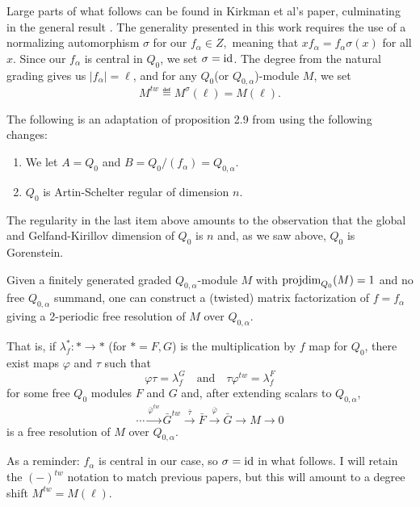 \documentclass [11pt, proquest] {uwthesis}[2020/02/24]
\begin{document}
    Large parts of what follows can be found in Kirkman et al's paper, culminating in the general result \cite{kirkman13}. The generality presented in this work requires the use of a normalizing automorphism $\sigma$ for our $f_\alpha\in Z,$ meaning that $xf_\alpha=f_\alpha\sigma(x)$ for all $x$. Since our $f_\alpha$ is central in $Q_0$, we  set $\sigma=\operatorname{id}$. The degree from the natural grading gives us $|f_\alpha|=\ell$, and for any $Q_0$(or $Q_{0,\alpha}$)-module $M$, we set
    \[M^{tw}\eqdef M^\sigma(\ell)=M(\ell).\]
    
    The following is an adaptation of proposition 2.9 from \cite{kirkman13} using the following changes:
    \begin{enumerate}
        \item We let $A=Q_0$ and $B=Q_0/(f_\alpha)=Q_{0,\alpha}.$
        \item $Q_0$ is Artin-Schelter regular of dimension $n$.
    \end{enumerate}
    The regularity in the last item above amounts to the observation that the global and Gelfand-Kirillov dimension of $Q_0$ is $n$ and, as we saw above, $Q_0$ is Gorenstein.
    \begin{prop}
        Given a finitely generated graded $Q_{0,\alpha}$-module $M$ with $\operatorname{projdim}_{Q_0}(M)=1$ and no free $Q_{0,\alpha}$ summand, one can construct a (twisted) matrix factorization of $f=f_\alpha$ giving a 2-periodic free resolution of $M$ over $Q_{0,\alpha}$. 
        
        That is, if $\lambda_f^*:\ast\to \ast$ (for $\ast=F,G$) is the multiplication by $f$ map for $Q_0$, there exist maps $\varphi$ and $\tau$ such that
        \[\varphi\tau = \lambda_f^G\quad\text{and}\quad \tau\varphi^{tw}=\lambda_f^F\]
        for some free $Q_0$ modules $F$ and $G$ and, after extending scalars to $Q_{0,\alpha}$,
        \[\cdots\xrightarrow{\bar\varphi^{tw}}\bar G^{tw}\xrightarrow{\bar\tau} \bar F\xrightarrow{\bar\varphi} \bar G\to M\to 0\]
        is a free resolution of $M$ over $Q_{0,\alpha}.$
    \end{prop}
    
    \begin{rmk}
    As a reminder: $f_\alpha$ is central in our case, so $\sigma=\operatorname{id}$ in what follows. I will retain the $(-)^{tw}$ notation to match previous papers, but this will amount to a degree shift $M^{tw}=M(\ell).$
    \end{rmk}
    
\end{document}
